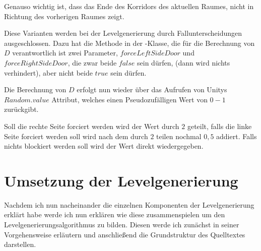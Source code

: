 Genauso wichtig ist, dass das Ende des Korridors des aktuellen Raumes, nicht in Richtung des vorherigen Raumes zeigt.

Diese Varianten werden bei der Levelgenerierung durch Fallunterscheidungen ausgeschlossen. %
Dazu hat die Methode  in der -Klasse, die für die Berechnung von $D$ verantwortlich ist zwei Parameter, $forceLeftSideDoor$ und $forceRightSideDoor$, die zwar beide $false$ sein dürfen, (dann wird nichts verhindert), aber nicht beide $true$ sein dürfen.

Die Berechnung von $D$ erfolgt nun wieder über das Aufrufen von Unitys $Random.value$ Attribut, welches einen Pseudozufälligen Wert von $0-1$ zurückgibt.

Soll die rechte Seite forciert werden wird der Wert durch $2$ geteilt, falls die linke Seite forciert werden soll wird nach dem durch $2$ teilen nochmal $0,5$ addiert. Falls nichts blockiert werden soll wird der Wert direkt wiedergegeben.

\section{Umsetzung der Levelgenerierung}

Nachdem ich nun nacheinander die einzelnen Komponenten der Levelgenerierung erklärt habe werde ich nun erklären wie diese zusammenspielen um den Levelgenerierungsalgorithmus zu bilden. Diesen werde ich zunächst in seiner Vorgehensweise erläutern und anschließend die Grundstruktur des Quelltextes darstellen.

